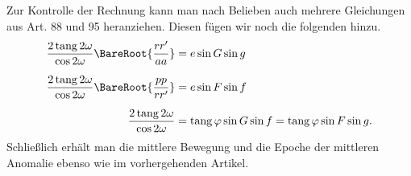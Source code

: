 Zur Kontrolle der Rechnung kann man nach Belieben auch mehrere Gleichungen aus Art. 88 und 95 heranziehen. Diesen fügen wir noch die folgenden hinzu.
\[
\begin{aligned}
\dfrac{2\operatorname{tang}2\omega}{\cos 2\omega}\BareRoot{\dfrac{rr'}{aa}}&=e\sin G\sin g\\[6pt]
\dfrac{2\operatorname{tang}2\omega}{\cos 2\omega}\BareRoot{\dfrac{pp}{rr'}}&=e\sin F\sin f\\[6pt]
\dfrac{2\operatorname{tang}2\omega}{\cos 2\omega}&=\operatorname{tang}\varphi\sin G\sin f=\operatorname{tang}\varphi\sin F\sin g.
\end{aligned}
\]
Schließlich erhält man die mittlere Bewegung und die Epoche der mittleren Anomalie ebenso wie im vorhergehenden Artikel.
